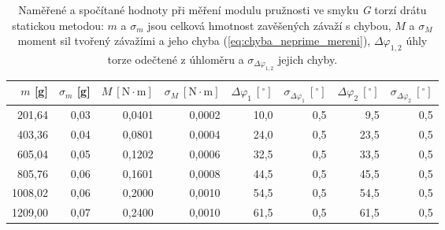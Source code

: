 \documentclass[english]{article}
\newcommand{\unit}[1]{\mathrm{#1}}
\begin{document}
\begin{table}[htbp]
  \centering
	       \begin{tabular}{|r|r|r|r|r|r|r|r|}
           \hline
          $m$ [g] & $\sigma_m$ [g] & $M\unit{\ [N\cdot m]}$ & $\sigma_{M}\unit{\ [N\cdot m]}$ & $\Delta \varphi_1 \unit{\ [^\circ] }$  & $\sigma_{\Delta \varphi_1 } \unit{\ [^\circ] }$ & $\Delta \varphi_2 \unit{\ [^\circ] }$  & $\sigma_{\Delta \varphi_2 } \unit{\ [^\circ] }$ \bigstrut\\
              \hline
           201,64 & 0,03  & 0,0401 & 0,0002 & 10,0  & 0,5   & 9,5   & 0,5 \bigstrut\\
           \hline
           403,36 & 0,04  & 0,0801 & 0,0004 & 24,0  & 0,5   & 23,5  & 0,5 \bigstrut\\
           \hline
           605,04 & 0,05  & 0,1202 & 0,0006 & 32,5  & 0,5   & 33,5  & 0,5 \bigstrut\\
           \hline
           805,76 & 0,06  & 0,1601 & 0,0008 & 44,5  & 0,5   & 45,5  & 0,5 \bigstrut\\
           \hline
           1008,02 & 0,06  & 0,2000 & 0,0010 & 54,5  & 0,5   & 54,5  & 0,5 \bigstrut\\
           \hline
           1209,00 & 0,07  & 0,2400 & 0,0010 & 61,5  & 0,5   & 61,5  & 0,5 \bigstrut\\
           \hline
           \end{tabular}%
 \caption{Naměřené a spočítané hodnoty při měření modulu pružnosti ve smyku \emph{G} torzí drátu statickou metodou: $m$ a $\sigma_m$ jsou celková hmotnost zavěšených závaží s chybou, $M$ a $\sigma_{M}$ moment sil tvořený závažími a jeho chyba (\ref{eq:chyba_neprime_mereni}), $\Delta \varphi_{1,2}$ úhly torze odečtené z úhloměru a $\sigma_{\Delta \varphi_{1,2}}$ jejich chyby. }
 \label{tab:G1}%
\end{table}%
\end{document}
